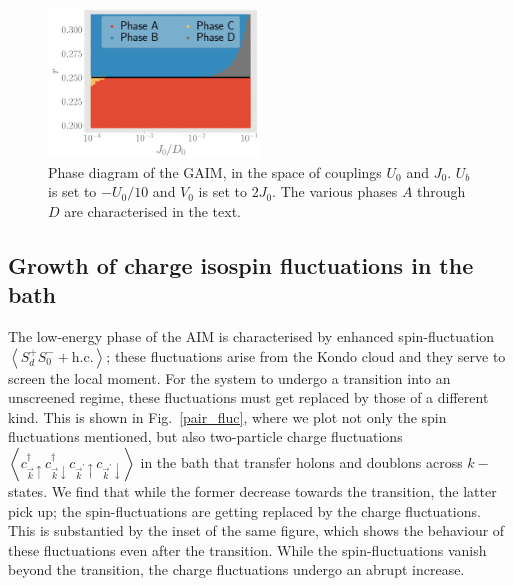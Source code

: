 \documentclass[reprint,superscriptaddress,floatfix]{revtex4-2}
\begin{document}
\begin{figure}[!htb]
	\includegraphics[width=0.5\textwidth]{../figures/phase-map-MIT.pdf}
	\caption{Phase diagram of the GAIM, in the space of couplings \(U_0\) and \(J_0\). \(U_b\) is set to \(-U_0/10\) and \(V_0\) is set to \(2J_0\). The various phases \(A\) through \(D\) are characterised in the text.}
	\label{phase-diag}
\end{figure}

\subsection{Growth of charge isospin fluctuations in the bath}
The low-energy phase of the AIM is characterised by enhanced spin-fluctuation \(\left<S_d^+S_0^- + \text{h.c.}\right>\); these fluctuations arise from the Kondo cloud and they serve to screen the local moment. For the system to undergo a transition into an unscreened regime, these fluctuations must get replaced by those of a different kind. This is shown in Fig.~\ref{pair_fluc}, where we plot not only the spin fluctuations mentioned, but also two-particle charge fluctuations \(\left<c^\dagger_{\vec k \uparrow} c^\dagger_{\vec k \downarrow} c_{\vec k^\prime \uparrow} c_{\vec k^\prime \downarrow}\right>\) in the bath that transfer holons and doublons across \(k-\)states. We find that while the former decrease towards the transition, the latter pick up; the spin-fluctuations are getting replaced by the charge fluctuations. This is substantied by the inset of the same figure, which shows the behaviour of these fluctuations even after the transition. While the spin-fluctuations vanish beyond the transition, the charge fluctuations undergo an abrupt increase.
\end{document}
